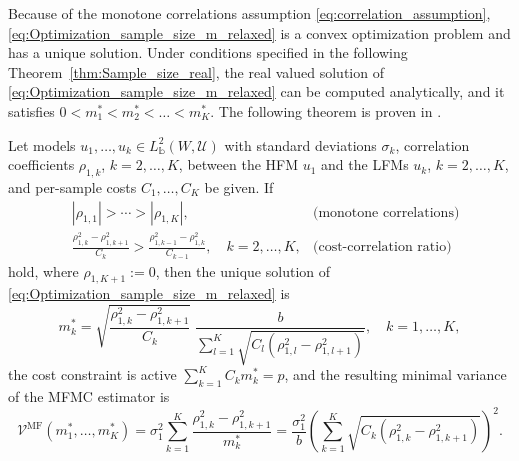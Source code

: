 Because of the monotone correlations assumption \eqref{eq:correlation_assumption},
\eqref{eq:Optimization_sample_size_m_relaxed} is a convex optimization problem and has a unique
solution.
Under conditions specified in the following Theorem~\ref{thm:Sample_size_real}, the 
real valued solution
of \eqref{eq:Optimization_sample_size_m_relaxed} can be computed analytically, and it satisfies
$0  < m_1^* < m_2^* <  \ldots < m_K^*$.
The following theorem is proven in \cite[Th.~3.4]{BPeherstorfer_KWillcox_MDGunzburger_2016a}.

\begin{theorem}   \label{thm:Sample_size_real}
   Let models $u_1, \ldots, u_k \in   L_{\mathbb{b}}^2(W, {\mathcal U})$ with
   standard deviations $\sigma_k$, correlation coefficients $\rho_{1,k}$, $k = 2, \ldots, K$,
   between the HFM $u_1$  and the  LFMs $u_k$, $k = 2, \ldots, K$, and 
   per-sample costs $C_1, \ldots, C_K$ be given.
   If 
   \begin{subequations}\label{eq:Sample_size_real_assumptions}
   \begin{align}
       \label{eq:Sample_size_real_assumptions_a}
        & |\rho_{1,1}| > \cdots > |\rho_{1,K}|, & \text{(monotone correlations)} \\
      \label{eq:Sample_size_real_assumptions_b}
        & \frac{ \rho_{1,k}^2 - \rho_{1,k+1}^2 }{C_k} > \frac{ \rho_{1,k-1}^2 - \rho_{1,k}^2 }{C_{k-1}}, \quad k=2,\ldots,K, 
                                                                  & \text{(cost-correlation ratio)}
    \end{align}
    \end{subequations}
    hold, where $\rho_{1,K+1} :=0$, then the unique solution of \eqref{eq:Optimization_sample_size_m_relaxed} is
    \begin{equation}\label{eq:MFMC_RealValued_Sample_Size}
             m_k^* = \sqrt{\frac{\rho_{1,k}^2 - \rho_{1,k+1}^2}{C_k}} \; 
                          \frac{b}{\sum_{l=1}^K \sqrt{C_l (\rho_{1,l}^2 - \rho_{1,l+1}^2)}},
             \quad k = 1, \ldots, K, 
     \end{equation}
    the cost constraint is active $\sum_{k=1}^K C_km_k^* = p$, 
    and the resulting minimal variance of the MFMC estimator is
     \begin{equation}\label{eq:MFMC_variance_optimal}
           \mathcal{V}^{\text{MF}}(m_1^*, \ldots, m_K^*)
           =   \sigma_1^2  \sum_{k=1}^K \frac{ \rho_{1,k}^2 - \rho_{1,k+1}^2}{m_k^*}
           =  \frac{\sigma_1^2}{b}\!\left(\sum_{k=1}^K \sqrt{C_k (\rho_{1,k}^2 - \rho_{1,k+1}^2) }\right)^{\!2}.
       \end{equation}
\end{theorem}

